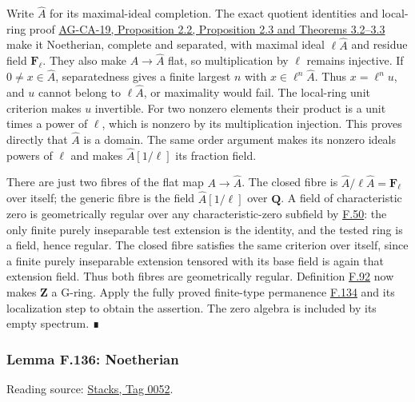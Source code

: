 \documentclass[11pt,a4paper,openany]{report}
\begin{document}
Write \(\widehat A\) for its maximal-ideal completion. The exact quotient identities and local-ring proof \href{https://github.com/KokunoYumeto/open-math-courses/blob/d02d0a3669f42579db037cd44de1d113fdd770a1/docs/courses/AG-CA/src/completion.md}{AG-CA-19, Proposition 2.2, Proposition 2.3 and Theorems 3.2--3.3} make it Noetherian, complete and separated, with maximal ideal \(\ell\widehat A\) and residue field \(\mathbf F_\ell\). They also make \(A\to\widehat A\) flat, so multiplication by \(\ell\) remains injective. If \(0\ne x\in\widehat A\), separatedness gives a finite largest \(n\) with \(x\in\ell^n\widehat A\). Thus \(x=\ell^n u\), and \(u\) cannot belong to \(\ell\widehat A\), or maximality would fail. The local-ring unit criterion makes \(u\) invertible. For two nonzero elements their product is a unit times a power of \(\ell\), which is nonzero by its multiplication injection. This proves directly that \(\widehat A\) is a domain. The same order argument makes its nonzero ideals powers of \(\ell\) and makes \(\widehat A[1/\ell]\) its fraction field.

There are just two fibres of the flat map \(A\to\widehat A\). The closed fibre is \(\widehat A/\ell\widehat A=\mathbf F_\ell\) over itself; the generic fibre is the field \(\widehat A[1/\ell]\) over \(\mathbf Q\). A field of characteristic zero is geometrically regular over any characteristic-zero subfield by \hyperref[AG-RG-S05-algebra-lemma-geometrically-regular]{F.50}: the only finite purely inseparable test extension is the identity, and the tested ring is a field, hence regular. The closed fibre satisfies the same criterion over itself, since a finite purely inseparable extension tensored with its base field is again that extension field. Thus both fibres are geometrically regular. Definition \hyperref[AG-RG-S05-more-algebra-definition-G-ring]{F.92} now makes \(\mathbf Z\) a G-ring. Apply the fully proved finite-type permanence \hyperref[AG-RG-S05-more-algebra-proposition-finite-type-over-G-ring]{F.134} and its localization step to obtain the assertion. The zero algebra is included by its empty spectrum. ∎

\label{AG-RG-S05-topology-lemma-Noetherian}

\subsubsection{Lemma F.136: Noetherian}\label{AG-RG-S05-lemma-f.136-noetherian}

Reading source: \href{https://stacks.math.columbia.edu/tag/0052}{Stacks, Tag 0052}.
\end{document}
